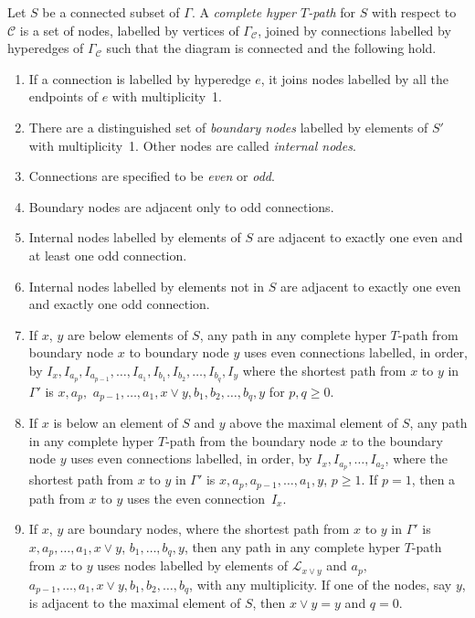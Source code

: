 \documentclass[pdftex]{sigma}
\numberwithin{equation}{section}
\begin{document}
\begin{Definition}\label{def:hyperTpath}
Let $S$ be a connected subset of $\Gamma$. A \emph{complete hyper $T$-path} for $S$ with respect to $\mathcal{C}$ is a set of nodes, labelled by vertices of $\Gamma_{\mathcal{C}}$, joined by connections labelled by hyperedges of $\Gamma_{\mathcal{C}}$ such that the diagram is connected and the following hold.
\begin{enumerate}\itemsep=0pt
 \item If a connection is labelled by hyperedge $e$, it joins nodes labelled by all the endpoints of $e$ with multiplicity~1.
 \item There are a distinguished set of \emph{boundary nodes} labelled by elements of $S'$ with multiplicity~1. Other nodes are called \emph{internal nodes}.
 \item Connections are specified to be \emph{even} or \emph{odd}.
 \item Boundary nodes are adjacent only to odd connections.
 \item Internal nodes labelled by elements of $S$ are adjacent to exactly one even and at least one odd connection.
 \item Internal nodes labelled by elements not in $S$ are adjacent to exactly one even and exactly one odd connection.
 \item If $x$, $y$ are below elements of $S$, any path in any complete hyper $T$-path from boundary node $x$ to boundary node $y$ uses even connections labelled, in order, by $I_x,I_{a_p},I_{a_{p-1}},\dots,I_{a_1},I_{b_1},\allowbreak I_{b_2},\dots,I_{b_q},I_y$ where the shortest path from $x$ to $y$ in $\Gamma'$ is $x,a_p,$ $a_{p-1},\dots,a_1,x\vee y,b_1,b_2,\dots,\allowbreak b_q,y$ for $p,q \geq 0$.
 \item If $x$ is below an element of $S$ and $y$ above the maximal element of $S$, any path in any complete hyper $T$-path from the boundary node $x$ to the boundary node $y$ uses even connections labelled, in order, by $I_x,I_{a_p},\ldots,I_{a_2}$, where the shortest path from $x$ to $y$ in $\Gamma'$ is $x,a_p,a_{p-1},\ldots,a_1,y$, $p \geq 1$. If $p = 1$, then a path from $x$ to $y$ uses the even connec\-tion~$I_x$.

 \item If $x$, $y$ are boundary nodes, where the shortest path from $x$ to $y$ in $\Gamma'$ is $x,a_p,\ldots,a_1,x\vee y$, $b_1, \ldots,b_q,y$, then any path in any complete hyper $T$-path from $x$ to $y$ uses nodes labelled by elements of $\mathcal{L}_{x\vee y}$ and $a_p,$ $a_{p-1},\dots,a_1,x\vee y,b_1,b_2,\dots,b_q$, with any multiplicity. If one of the nodes, say $y$, is adjacent to the maximal element of $S$, then $x \vee y = y$ and $q = 0$.
\end{enumerate}
\end{Definition}
\end{document}
